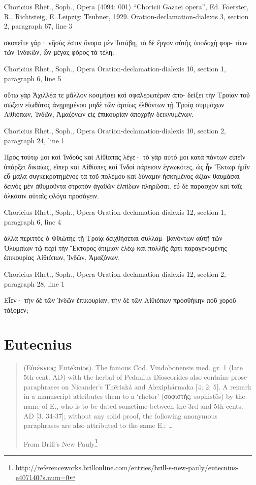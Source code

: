 \documentclass[12pt,letterpaper,twoside,final]{memoir}
\begin{document}
\begin{greek}

Choricius Rhet., Soph., Opera (4094: 001)
“Choricii Gazaei opera”, Ed. Foerster, R., Richtsteig, E.
Leipzig: Teubner, 1929.
Oration-declamation-dialexis 3, section 2, paragraph 67, line 3

   σκοπεῖτε γάρ· νῆσός 
ἐστιν ὄνομα μὲν Ἰοτάβη, τὸ δὲ ἔργον αὐτῆς ὑποδοχὴ φορ-
τίων τῶν Ἰνδικῶν, ὧν μέγας φόρος τὰ τέλη. 


Choricius Rhet., Soph., Opera 
Oration-declamation-dialexis 10, section 1, paragraph 6, line 5

   οὕτω 
γὰρ Ἀχιλλέα τε μᾶλλον κοσμήσει καὶ σφαλερωτέραν ἀπο-
δείξει τὴν Τροίαν τοῦ σώζειν εἰωθότος ἀνῃρημένου μηδὲ 
τῶν ἀρτίως ἐλθόντων τῇ Τροίᾳ συμμάχων Αἰθιόπων, 
Ἰνδῶν, Ἀμαζόνων εἰς ἐπικουρίαν ἀποχρῆν δεικνυμένων. 


Choricius Rhet., Soph., Opera 
Oration-declamation-dialexis 10, section 2, paragraph 24, line 1

Πρὸς τούτῳ μοι καὶ Ἰνδοὺς καὶ Αἰθίοπας λέγε· τὸ 
γὰρ αὐτό μοι κατὰ πάντων εἰπεῖν ὑπάρξει δικαίως, εἴπερ 
καὶ Αἰθίοπες καὶ Ἰνδοὶ πάρεισιν ἐγνωκότες, ὡς ἦν Ἕκτωρ 
ἡμῖν εὖ μάλα συγκεκροτημένος τὰ τοῦ πολέμου καὶ 
δύναμιν ἠσκημένος ἀξίαν θαυμάσαι δεινὸς μὲν ἀθυμοῦντα 
στρατὸν ἀγαθῶν ἐλπίδων πληρῶσαι, εὖ δὲ παρασχὸν καὶ 
ταῖς ὁλκάσιν αὐταῖς φλόγα προσάγειν. 


Choricius Rhet., Soph., Opera 
Oration-declamation-dialexis 12, section 1, paragraph 6, line 4

ἀλλὰ περιττὸς ὁ Φθιώτης τῇ Τροίᾳ δειχθήσεται συλλαμ-
βανόντων αὐτῇ τῶν Ὀλυμπίων τῷ περὶ τὴν Ἕκτορος 
ἀτιμίαν ἐλέῳ καὶ πολλῆς ἄρτι παραγενομένης ἐπικουρίας 
Αἰθιόπων, Ἰνδῶν, Ἀμαζόνων. 


Choricius Rhet., Soph., Opera 
Oration-declamation-dialexis 12, section 2, paragraph 28, line 1

Εἶεν· τὴν δὲ τῶν Ἰνδῶν ἐπικουρίαν, τὴν δὲ τῶν 
Αἰθιόπων προσθήκην ποῦ χοροῦ τάξομεν; 

\end{greek}



\section{Eutecnius}
\blockquote[From Brill's New Pauly\footnote{\url{http://referenceworks.brillonline.com/entries/brill-s-new-pauly/eutecnius-e407140?s.num=0}}]{(Εὐτέκνιος; Eutéknios). The famous Cod. Vindobonensis med. gr. 1 (late 5th cent. AD) with the herbal of Pedanius Dioscorides also contains prose paraphrases on  Nicander's	Thēriaká and Alexiphármaka [4; 2; 5]. A remark in a manuscript attributes them to a ‘rhetor’ (σοφιστής; sophistḗs) by the name of E., who is to be dated sometime between the 3rd and 5th cents. AD [3. 34-37]; without any solid proof, the following anonymous paraphrases are also attributed to the same E.: …}
\end{document}
